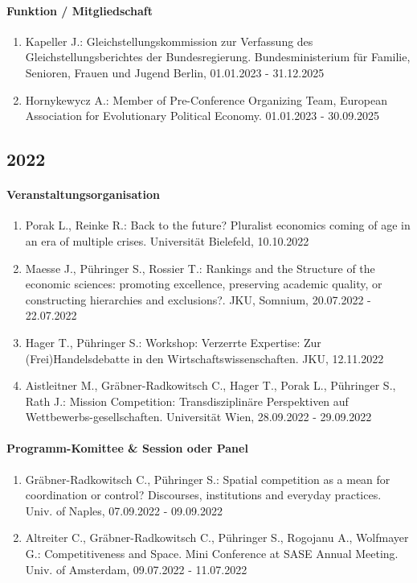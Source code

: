 \paragraph{Funktion / Mitgliedschaft}
\begin{enumerate}[leftmargin=*, labelsep=0.5cm]
\item Kapeller J.: Gleichstellungskommission zur Verfassung des Gleichstellungsberichtes der Bundesregierung. Bundesministerium für Familie, Senioren, Frauen und Jugend Berlin, 01.01.2023 - 31.12.2025
\item Hornykewycz A.: Member of Pre-Conference Organizing Team, European Association for Evolutionary Political Economy. 01.01.2023 - 30.09.2025
\end{enumerate}
\subsection*{2022}
\paragraph{Veranstaltungsorganisation}
\begin{enumerate}[leftmargin=*, labelsep=0.5cm]
\item Porak L., Reinke R.: Back to the future? Pluralist economics coming of age in an era of multiple crises. Universität Bielefeld, 10.10.2022
\item Maesse J., Pühringer S., Rossier T.: Rankings and the Structure of the economic sciences: promoting excellence, preserving academic quality, or constructing hierarchies and exclusions?. JKU, Somnium, 20.07.2022 - 22.07.2022
\item Hager T., Pühringer S.: Workshop: Verzerrte Expertise: Zur (Frei)Handelsdebatte in den Wirtschaftswissenschaften. JKU, 12.11.2022
\item Aistleitner M., Gräbner-Radkowitsch C., Hager T., Porak L., Pühringer S., Rath J.: Mission Competition: Transdisziplinäre Perspektiven auf Wettbewerbs-gesellschaften. Universität Wien, 28.09.2022 - 29.09.2022
\end{enumerate}

\paragraph{Programm-Komittee \& Session oder Panel}
\begin{enumerate}[leftmargin=*, labelsep=0.5cm]
\item Gräbner-Radkowitsch C., Pühringer S.: Spatial competition as a mean for coordination or control? Discourses, institutions and everyday practices. Univ. of Naples, 07.09.2022 - 09.09.2022
\item Altreiter C., Gräbner-Radkowitsch C., Pühringer S., Rogojanu A., Wolfmayer G.: Competitiveness and Space. Mini Conference at SASE Annual Meeting. Univ. of Amsterdam, 09.07.2022 - 11.07.2022
\end{enumerate}

